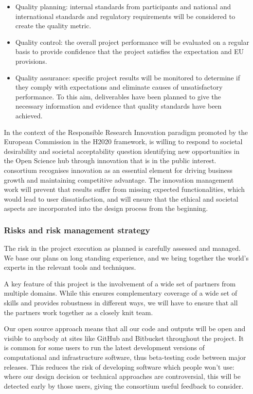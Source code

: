 \begin{itemize}
\item Quality planning: internal standards from participants and national and international standards and
regulatory requirements will be considered to create the quality metric.
\item Quality control: the overall project performance will be evaluated on a regular basis to provide
confidence that the project satisfies the expectation and EU provisions.
\item Quality assurance: specific project results will be monitored to determine if they comply with
expectations and eliminate causes of unsatisfactory performance. To this aim, deliverables have been
planned to give the necessary information and evidence that quality standards have been achieved.
\end{itemize}

In the context of the Responsible Research Innovation paradigm promoted by the European Commission in
the H2020 framework, \TheProject is willing to respond to societal desirability and societal acceptability
question identifying new opportunities in the Open Science hub through innovation that is in the public
interest. \TheProject consortium recognises innovation as an essential element for driving business growth
and maintaining competitive advantage. The innovation management work will prevent that \TheProject
results suffer from missing expected functionalities, which would lead to user dissatisfaction, and will
ensure that the ethical and societal aspects are incorporated into the design process from the beginning.

\subsubsection{Risks and risk management strategy}\label{sec:risks}

The risk in the project execution as planned is carefully assessed and
managed. We base our plans on long standing experience, and we bring
together the world's experts in the relevant tools and techniques.

A key feature of this project is the involvement of a wide set of
partners from multiple domains. While this ensures complementary
coverage of a wide set of skills and provides robustness in different
ways, we will have to ensure that all the partners work together as
a closely knit team.

Our open source approach means that all our code and outputs
will be open and visible to anybody at sites like GitHub and Bitbucket
throughout the project. It is common for some users to run the latest
development versions of computational and infrastructure software, thus
beta-testing code between major releases.
This reduces the risk of developing software which people won't use:
where our design decision or technical approaches are
controversial, this will be detected early by those users, giving the
consortium useful feedback to consider.

